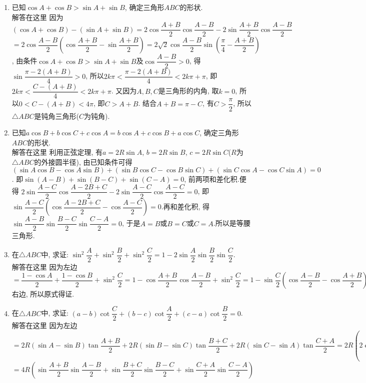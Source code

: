 \documentclass[10pt,a4paper]{article}
\begin{document}
\begin{enumerate}[1.]
因为$A+B=120^\circ$, 所以$\dfrac 12\cos (A-B)=\dfrac 12$, 所以$A=B$.
所以$\triangle ABC$为等边三角形.
\item 已知$\cos A+\cos B>\sin A+\sin B$, 确定三角形$ABC$的形状.\\
解答在这里 因为$(\cos A+\cos B)-(\sin A+\sin B)=2\cos \dfrac{A+B}2\cos \dfrac{A-B}2-2\sin \dfrac{A+B}2\cos \dfrac{A-B}2$
$=2\cos \dfrac{A-B}2(\cos \dfrac{A+B}2-\sin \dfrac{A+B}2)=2\sqrt 2\cos \dfrac{A-B}2\sin (\dfrac{\pi}4-\dfrac{A+B}2)$,
由条件$\cos A+\cos B>\sin A+\sin B$及$\cos \dfrac{A-B}2>0$, 得$\sin \dfrac{\pi -2(A+B)}4>0$,
所以$2k\pi <\dfrac{\pi -2(A+B)}4<2k\pi +\pi$, 即$2k\pi <\dfrac{C-(A+B)}4<2k\pi +\pi$.
又因为$A,B,C$是三角形的内角, 取$k=0$, 所以$0<C-(A+B)<4\pi$, 即$C>A+B$.
结合$A+B=\pi -C$, 有$C>\dfrac{\pi}2$, 所以$\triangle ABC$是钝角三角形($C$为钝角).
\item 已知$a\cos B+b\cos C+c\cos A=b\cos A+c\cos B+a\cos C$, 确定三角形$ABC$的形状.\\
解答在这里 利用正弦定理, 有$a=2R\sin A$, $b=2R\sin B$, $c=2R\sin C$($R$为$\triangle ABC$的外接圆半径), 由已知条件可得$(\sin A\cos B-\cos A\sin B)+(\sin B\cos C-\cos B\sin C)+(\sin C\cos A-\cos C\sin A)=0$.
即$\sin (A-B)+\sin (B-C)+\sin (C-A)=0$, 前两项和差化积.便得
$2\sin \dfrac{A-C}2\cos \dfrac{A-2B+C}2-2\sin \dfrac{A-C}2\cos \dfrac{A-C}2=0$,
即$\sin \dfrac{A-C}2(\cos \dfrac{A-2B+C}2-\cos \dfrac{A-C}2)=0$.再和差化积,
得$\sin \dfrac{A-B}2\sin \dfrac{B-C}2\sin \dfrac{C-A}2=0$, 于是$A=B$或$B=C$或$C=A$.所以是等腰三角形.
\item 在$\triangle ABC$中, 求证: $\sin ^2\dfrac A2+\sin ^2\dfrac B2+\sin ^2\dfrac C2=1-2\sin \dfrac A2\sin \dfrac B2\sin \dfrac C2$.\\
解答在这里 因为左边$=\dfrac{1-\cos A}2+\dfrac{1-\cos B}2+\sin ^2\dfrac C2=1-\cos \dfrac{A+B}2\cos \dfrac{A-B}2+\sin ^2\dfrac C2=1-\sin \dfrac C2(\cos \dfrac{A-B}2-\cos \dfrac{A+B}2) =1-(-2)\sin \dfrac C2\sin \dfrac A2\sin (-\dfrac B2)=1-2\sin \dfrac A2\sin \dfrac B2\sin \dfrac C2=$右边, 所以原式得证.
\item 在$\triangle ABC$中, 求证: $(a-b)\cot \dfrac C2+(b-c)\cot \dfrac A2+(c-a)\cot \dfrac B2=0$.\\
解答在这里 因为左边$=2R(\sin A-\sin B)\tan \dfrac{A+B}2+2R(\sin B-\sin C)\tan \dfrac{B+C}2+2R(\sin C-\sin A)\tan \dfrac{C+A}2=2R(2\cos \dfrac{A+B}2\sin \dfrac{A-B}2\cdot \dfrac{\sin \dfrac{A+B}2}{\cos \dfrac{A+B}2}+2\cos \dfrac{B+C}2\sin \dfrac{B-C}2\cdot \dfrac{\sin \dfrac{B+C}2}{\cos \dfrac{B+C}2}+2\cos \dfrac{C+A}2\sin \dfrac{C-A}2\cdot \dfrac{\sin \dfrac{C+A}2}{\cos \dfrac{C+A}2})$
$=4R(\sin \dfrac{A+B}2\sin \dfrac{A-B}2+\sin \dfrac{B+C}2\sin \dfrac{B-C}2+\sin \dfrac{C+A}2\sin \dfrac{C-A}2)$

\end{enumerate}
\end{document}
